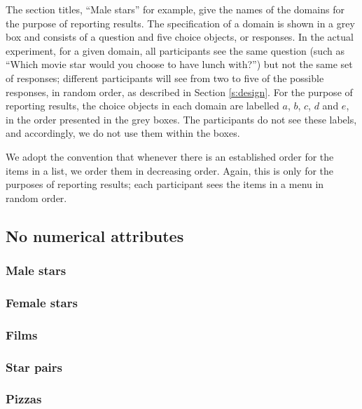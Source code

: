 \documentclass[11pt,letter]{article}
\newcommand{\menu}{menu}
\begin{document}
The section titles, ``Male stars'' for example, give the names of the domains for the purpose of reporting results.
The specification of a domain is shown in a grey box and consists of a question and five choice objects, or responses.
In the actual experiment, for a given domain, all participants see the same question (such as ``Which movie star would you choose to have lunch with?'') but not the same set of responses; different participants will see from two to five of the possible responses, in random order, as described in Section \ref{s:design}.
For the purpose of reporting results, the choice objects in each domain are labelled $a$, $b$, $c$, $d$ and $e$, in the order presented in the grey boxes.
The participants do not see these labels, and accordingly, we do not use them within the boxes.

We adopt the convention that whenever there is an established order for the items in a list, we order them in decreasing order.
Again, this is only for the purposes of reporting results; each participant sees the items in a \menu{} in random order.

\subsection{No numerical attributes}

\subsubsection{Male stars}



\subsubsection{Female stars}



\subsubsection{Films}



\subsubsection{Star pairs}



\subsubsection{Pizzas}
\end{document}
